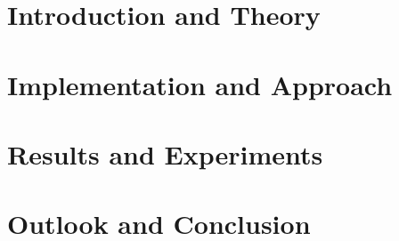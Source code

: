 \documentclass[11pt,a4paper,biblography=totoc,index=totoc,headsepline,footsepline,footinlcude=false,BCOR12mm,DIV13]{scrbook}
\begin{document}
 \frontmatter



%
%	


%	

 

 

 
 

 


 \tableofcontents

 \mainmatter


	 \part[Introduction and Theory]{Introduction and Theory}
	 \label{part:introAndBackgroundTheory}
	 
	 



	 \part[Implementation and Approach]{Implementation and Approach}
   
	 \label{part:secondP}

	 \part[Results and Experiments]{Results and Experiments}
   
	 \label{part:thirdP}

	 \part[Outlook and Conclusion]{Outlook and Conclusion}
   
	 \label{part:fourthP}
\end{document}
